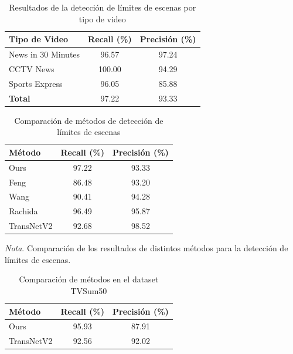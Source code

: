 \begin{table}[h]
    \centering
    \caption{Resultados de la detección de límites de escenas por tipo de video}
    \begin{tabular}{lcc}
        \hline
        \textbf{Tipo de Video} & \textbf{Recall (\%)} & \textbf{Precisión (\%)} \\
        \hline
        News in 30 Minutes     & 96.57 & 97.24 \\
        CCTV News              & 100.00 & 94.29 \\
        Sports Express         & 96.05 & 85.88 \\
        \hline
        \textbf{Total}         & 97.22 & 93.33 \\
        \hline
    \end{tabular}
\end{table}

\begin{table}[h]
    \centering
    \caption{Comparación de métodos de detección de límites de escenas}
    \begin{tabular}{lcc}
        \hline
        \textbf{Método} & \textbf{Recall (\%)} & \textbf{Precisión (\%)} \\
        \hline
        Ours             & 97.22 & 93.33 \\
        Feng        & 86.48 & 93.20 \\
        Wang       & 90.41 & 94.28 \\
        Rachida  & 96.49 & 95.87 \\
        TransNetV2   & 92.68 & 98.52 \\
        \hline
    \end{tabular}
    \begin{flushleft}
    \textit{Nota}. Comparación de los resultados de distintos métodos para la detección de límites de escenas.
    \end{flushleft}
\end{table}


\begin{table}[h]
    \centering
    \caption{Comparación de métodos en el dataset TVSum50}
    \begin{tabular}{lcc}
        \hline
        \textbf{Método} & \textbf{Recall (\%)} & \textbf{Precisión (\%)} \\
        \hline
        Ours             & 95.93 & 87.91 \\
        TransNetV2   & 92.56 & 92.02 \\
        \hline
    \end{tabular}
\end{table}